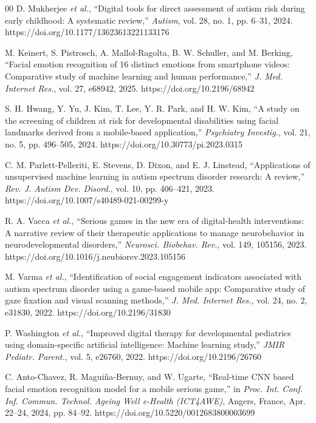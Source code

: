 \documentclass{ieeeaccess}
\begin{document}
	\begin{thebibliography}{00}
		 D. Mukherjee \emph{et al.}, ``Digital tools for direct assessment of autism risk during early childhood: A systematic review,'' \emph{Autism}, vol. 28, no. 1, pp. 6--31, 2024. https://doi.org/10.1177/13623613221133176
		
		 M. Keinert, S. Pistrosch, A. Mallol-Ragolta, B. W. Schuller, and M. Berking, ``Facial emotion recognition of 16 distinct emotions from smartphone videos: Comparative study of machine learning and human performance,'' \emph{J. Med. Internet Res.}, vol. 27, e68942, 2025. https://doi.org/10.2196/68942
		
		 S. H. Hwang, Y. Yu, J. Kim, T. Lee, Y. R. Park, and H. W. Kim, ``A study on the screening of children at risk for developmental disabilities using facial landmarks derived from a mobile-based application,'' \emph{Psychiatry Investig.}, vol. 21, no. 5, pp. 496--505, 2024. https://doi.org/10.30773/pi.2023.0315
		
		 C. M. Parlett-Pelleriti, E. Stevens, D. Dixon, and E. J. Linstead, ``Applications of unsupervised machine learning in autism spectrum disorder research: A review,'' \emph{Rev. J. Autism Dev. Disord.}, vol. 10, pp. 406--421, 2023. https://doi.org/10.1007/s40489-021-00299-y
		
		 R. A. Vacca \emph{et al.}, ``Serious games in the new era of digital-health interventions: A narrative review of their therapeutic applications to manage neurobehavior in neurodevelopmental disorders,'' \emph{Neurosci. Biobehav. Rev.}, vol. 149, 105156, 2023. https://doi.org/10.1016/j.neubiorev.2023.105156
		
		 M. Varma \emph{et al.}, ``Identification of social engagement indicators associated with autism spectrum disorder using a game-based mobile app: Comparative study of gaze fixation and visual scanning methods,'' \emph{J. Med. Internet Res.}, vol. 24, no. 2, e31830, 2022. https://doi.org/10.2196/31830
		
		 P. Washington \emph{et al.}, ``Improved digital therapy for developmental pediatrics using domain-specific artificial intelligence: Machine learning study,'' \emph{JMIR Pediatr. Parent.}, vol. 5, e26760, 2022. https://doi.org/10.2196/26760
		
		 C. Anto-Chavez, R. Maguiña-Bernuy, and W. Ugarte, ``Real-time CNN based facial emotion recognition model for a mobile serious game,'' in \emph{Proc. Int. Conf. Inf. Commun. Technol. Ageing Well e-Health (ICT4AWE)}, Angers, France, Apr. 22--24, 2024, pp. 84--92. https://doi.org/10.5220/0012683800003699
		

\end{thebibliography}
\end{document}

